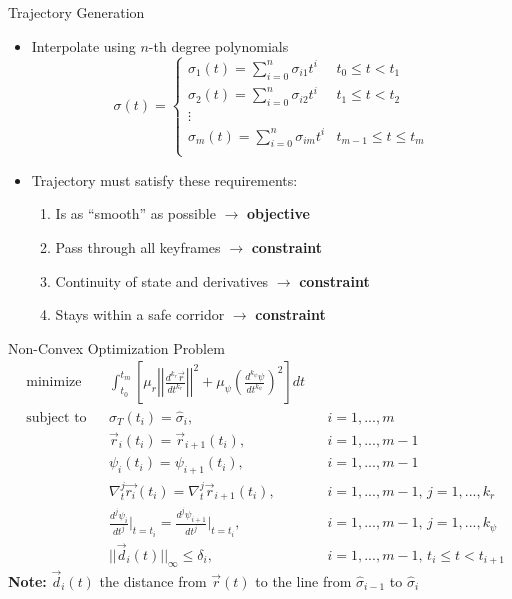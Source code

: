 \documentclass[onlymath]{beamer}
\begin{document}
\begin{frame}{Trajectory Generation}
\begin{itemize}
\item Interpolate using $n$-th degree polynomials
\begin{equation*}
    \sigma(t) = \begin{cases}
        \sigma_1(t) = \sum_{i = 0}^n \sigma_{i1} t^i & t_0 \le t < t_1 \\
        \sigma_2(t) = \sum_{i = 0}^n \sigma_{i2} t^i & t_1 \le t < t_2 \\
        \vdots & \\
        \sigma_m(t) = \sum_{i = 0}^n \sigma_{im} t^i & t_{m-1} \le t \le t_m \\
    \end{cases}
\end{equation*}

\item Trajectory must satisfy these requirements:
    \begin{enumerate}
    \item Is as ``smooth'' as possible $\rightarrow$ \textbf{objective}
    \item Pass through all keyframes $\rightarrow$ \textbf{constraint}
    \item Continuity of state and derivatives $\rightarrow$ \textbf{constraint}
    \item Stays within a safe corridor $\rightarrow$ \textbf{constraint}
    \end{enumerate}
\end{itemize}
\end{frame}

\begin{frame}{Non-Convex Optimization Problem}
    \begin{align*}
    & \text{minimize}
        & & \int_{t_0}^{t_m}{ \left[
            \mu_r    \left|\left| \frac{d^{k_r} \vec{r}}{d t^{k_r}} \right|\right|^2
          + \mu_\psi \left( \frac{d^{k_\psi} \psi}{d t^{k_\psi}} \right)^2
        \right] dt} \\
    & \text{subject to}
        & & \sigma_T(t_i) = \hat{\sigma}_i,
        & & i = 1, ..., m \\
    & & & \vec{r}_i(t_i) = \vec{r}_{i + 1}(t_i),
        & & i = 1, ..., m - 1 \\
    & & & \psi_i(t_i) = \psi_{i + 1}(t_i),
        & & i = 1, ..., m - 1 \\
    & & & \nabla_t^j \vec{r_i}(t_i) = \nabla_t^j \vec{r}_{i + 1}(t_i),
      & & i = 1, ..., m - 1, \, j = 1, ..., k_r \\
    & & & \frac{d^j \psi_i}{d t^j} \big|_{t = t_i} = \frac{d^j \psi_{i + 1}}{d t^j} \big|_{t = t_i},
      & & i = 1, ..., m - 1, \, j = 1, ..., k_\psi \\
    & & & ||\vec{d}_i(t)||_\infty \le \delta_i,
      & & i = 1, ..., m - 1, \, t_i \le t < t_{i + 1}
    \end{align*}
    \textbf{Note:} $\vec{d}_i(t)$ the distance from $\vec{r}(t)$ to the line from
          $\hat{\sigma}_{i - 1}$ to $\hat{\sigma}_i$
\end{frame}
\end{document}
